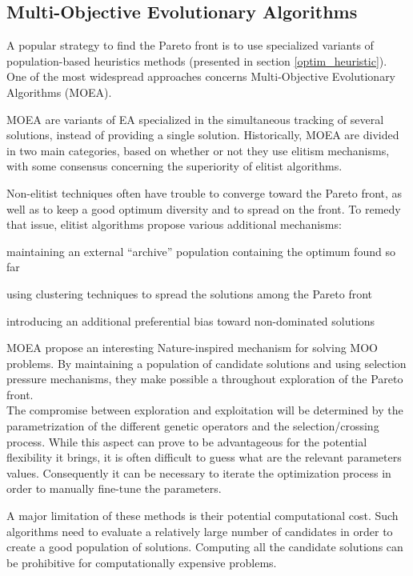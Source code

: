 \subsection{Multi-Objective Evolutionary Algorithms}

A popular strategy to find the Pareto front is to use specialized variants of population-based heuristics methods (presented in section \ref{optim_heuristic}). One of the most widespread approaches concerns Multi-Objective Evolutionary Algorithms (MOEA).

MOEA are variants of EA specialized in the simultaneous tracking of several solutions, instead of providing a single solution. Historically, MOEA are divided in two main categories, based on whether or not they use elitism mechanisms, with some consensus concerning the superiority of elitist algorithms.

Non-elitist techniques often have trouble to converge toward the Pareto front, as well as to keep a good optimum diversity and to spread on the front. To remedy that issue, elitist algorithms propose various additional mechanisms:
\begin{compactitem}
\item maintaining an external \enquote{archive} population containing the optimum found so far
\item using clustering techniques to spread the solutions among the Pareto front
\item introducing an additional preferential bias toward non-dominated solutions
\end{compactitem}

MOEA propose an interesting Nature-inspired mechanism for solving MOO problems. By maintaining a population of candidate solutions and using selection pressure mechanisms, they make possible a throughout exploration of the Pareto front.\\
The compromise between exploration and exploitation will be determined by the parametrization of the different genetic operators and the selection/crossing process. While this aspect can prove to be advantageous for the potential flexibility it brings, it is often difficult to guess what are the relevant parameters values. Consequently it can be necessary to iterate the optimization process in order to manually fine-tune the parameters.

A major limitation of these methods is their potential computational cost. Such algorithms need to evaluate a relatively large number of candidates in order to create a good population of solutions. Computing all the candidate solutions can be prohibitive for computationally expensive problems.

